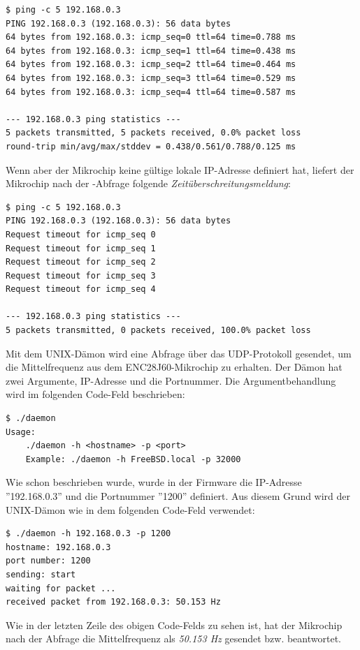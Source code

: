 \begin{verbatim}
$ ping -c 5 192.168.0.3
PING 192.168.0.3 (192.168.0.3): 56 data bytes
64 bytes from 192.168.0.3: icmp_seq=0 ttl=64 time=0.788 ms
64 bytes from 192.168.0.3: icmp_seq=1 ttl=64 time=0.438 ms
64 bytes from 192.168.0.3: icmp_seq=2 ttl=64 time=0.464 ms
64 bytes from 192.168.0.3: icmp_seq=3 ttl=64 time=0.529 ms
64 bytes from 192.168.0.3: icmp_seq=4 ttl=64 time=0.587 ms

--- 192.168.0.3 ping statistics ---
5 packets transmitted, 5 packets received, 0.0% packet loss
round-trip min/avg/max/stddev = 0.438/0.561/0.788/0.125 ms
\end{verbatim}

Wenn aber der Mikrochip keine gültige lokale IP-Adresse definiert hat, liefert der Mikrochip nach der -Abfrage folgende \textit{Zeitüberschreitungsmeldung}:  \smallskip \smallskip

\begin{verbatim}
$ ping -c 5 192.168.0.3
PING 192.168.0.3 (192.168.0.3): 56 data bytes
Request timeout for icmp_seq 0
Request timeout for icmp_seq 1
Request timeout for icmp_seq 2
Request timeout for icmp_seq 3
Request timeout for icmp_seq 4

--- 192.168.0.3 ping statistics ---
5 packets transmitted, 0 packets received, 100.0% packet loss
\end{verbatim}

Mit dem UNIX-Dämon wird eine Abfrage über das UDP-Protokoll gesendet, um die Mittelfrequenz aus dem ENC28J60-Mikrochip zu erhalten. Der Dämon hat zwei Argumente, IP-Adresse und die Portnummer. Die Argumentbehandlung wird im folgenden Code-Feld beschrieben:  \smallskip \smallskip

\begin{verbatim}
$ ./daemon 
Usage: 
	./daemon -h <hostname> -p <port>
	Example: ./daemon -h FreeBSD.local -p 32000
\end{verbatim}

Wie schon beschrieben wurde, wurde in der Firmware die IP-Adresse ''192.168.0.3'' und die Portnummer ''1200'' definiert. Aus diesem Grund wird der UNIX-Dämon wie in dem folgenden Code-Feld verwendet:

\begin{verbatim}
$ ./daemon -h 192.168.0.3 -p 1200
hostname: 192.168.0.3
port number: 1200
sending: start
waiting for packet ...
received packet from 192.168.0.3: 50.153 Hz
\end{verbatim}

Wie in der letzten Zeile des obigen Code-Felds zu sehen ist, hat der Mikrochip nach der Abfrage die Mittelfrequenz als \textit{50.153 Hz} gesendet bzw. beantwortet.


